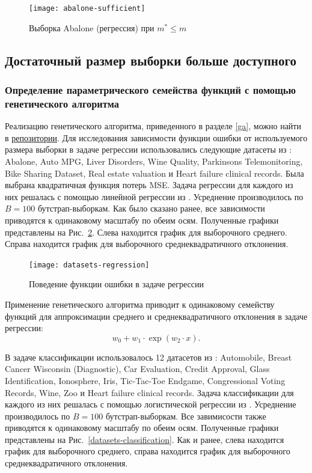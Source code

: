 \begin{figure}[h!]
    \centering
    \texttt{[image: abalone-sufficient]}
    \caption{Выборка Abalone (регрессия) при $m^* \leqslant m$}
    \label{abalone-sufficient}
\end{figure}

\subsection{Достаточный размер выборки больше доступного}

\subsubsection{Определение параметрического семейства функций с помощью генетического алгоритма}

Реализацию генетического алгоритма, приведенного в разделе \ref{ga}, можно найти в \href{https://github.com/kisnikser/Bayesian-Sample-Size-Estimation/tree/main/code/genetic_algorithm}{репозитории}. Для исследования зависимости функции ошибки от используемого размера выборки в задаче регрессии использовались следующие датасеты из \citep{UCI}: Abalone, Auto MPG, Liver Disorders, Wine Quality, Parkinsons Telemonitoring, Bike Sharing Dataset, Real estate valuation и Heart failure clinical records. Была выбрана квадратичная функция потерь MSE. Задача регрессии для каждого из них решалась с помощью линейной регрессии из \citep{scikit-learn}. Усреднение производилось по $B = 100$ бутстрап-выборкам. Как было сказано ранее, все зависимости приводятся к одинаковому масштабу по обеим осям. Полученные графики представлены на Рис.~\ref{datasets-regression}. Слева находится график для выборочного среднего. Справа находится график для выборочного среднеквадратичного отклонения.

\begin{figure}[h!]
    \centering
    \texttt{[image: datasets-regression]}
    \caption{Поведение функции ошибки в задаче регрессии}
    \label{datasets-regression}
\end{figure}

Применение генетического алгоритма приводит к одинаковому семейству функций для аппроксимации среднего и среднеквадратичного отклонения в задаче регрессии:
\[ w_0 + w_1 \cdot \exp(w_2 \cdot x). \]

В задаче классификации использовалось 12 датасетов из \citep{UCI}: Automobile, Breast Cancer Wisconsin (Diagnostic), Car Evaluation, Credit Approval, Glass Identification, Ionosphere, Iris, Tic-Tac-Toe Endgame, Congressional Voting Records, Wine, Zoo и Heart failure clinical records. Задача классификации для каждого из них решалась с помощью логистической регрессии из \citep{scikit-learn}. Усреднение производилось по $B = 100$ бутстрап-выборкам. Все завимисости также приводятся к одинаковому масштабу по обеим осям. Полученные графики представлены на Рис.~\ref{datasets-classification}. Как и ранее, слева находится график для выборочного среднего, справа находится график для выборочного среднеквадратичного отклонения.

